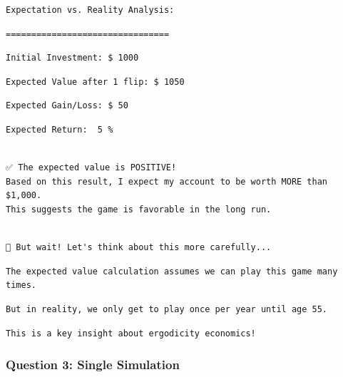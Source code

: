 \documentclass[
  letterpaper,
  DIV=11,
  numbers=noendperiod]{scrartcl}
\theoremstyle{definition}
\theoremstyle{remark}
\begin{document}
\begin{verbatim}
Expectation vs. Reality Analysis:
\end{verbatim}

\begin{verbatim}
================================
\end{verbatim}

\begin{verbatim}
Initial Investment: $ 1000 
\end{verbatim}

\begin{verbatim}
Expected Value after 1 flip: $ 1050 
\end{verbatim}

\begin{verbatim}
Expected Gain/Loss: $ 50 
\end{verbatim}

\begin{verbatim}
Expected Return:  5 %
\end{verbatim}

\begin{verbatim}

✅ The expected value is POSITIVE!
Based on this result, I expect my account to be worth MORE than $1,000.
This suggests the game is favorable in the long run.
\end{verbatim}

\begin{verbatim}

🤔 But wait! Let's think about this more carefully...
\end{verbatim}

\begin{verbatim}
The expected value calculation assumes we can play this game many times.
\end{verbatim}

\begin{verbatim}
But in reality, we only get to play once per year until age 55.
\end{verbatim}

\begin{verbatim}
This is a key insight about ergodicity economics!
\end{verbatim}

\subsubsection{Question 3: Single
Simulation}\label{question-3-single-simulation}
\end{document}
